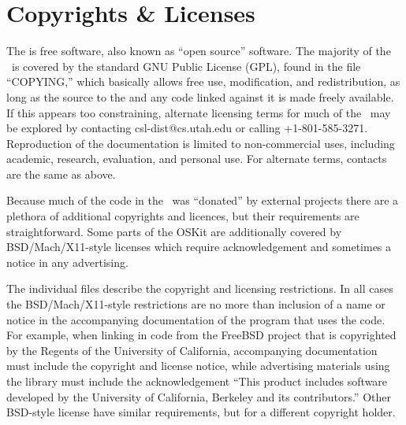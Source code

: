 %
% 
%
\label{licensing}

\section{Copyrights \& Licenses}

The \oskit{} is free software, also known as ``open source'' software.
The majority of the \oskit\ is covered by the standard GNU Public
License (GPL), found in the file ``COPYING,'' which basically allows
free use, modification, and redistribution, as long as the source to the
\oskit{} and any code linked against it is made freely available.
If this appears too constraining,
alternate licensing terms for much of the \oskit\ may be explored by
contacting csl-dist@cs.utah.edu or calling +1-801-585-3271.
Reproduction of the documentation is limited to non-commercial
uses, including academic, research, evaluation, and personal use.
For alternate terms, contacts are the same as above.

Because much of the code in the \oskit\ was ``donated'' by external
projects there are a plethora of additional copyrights and licences,
but their requirements are straightforward.
Some parts of the OSKit are additionally covered by BSD/Mach/X11-style
licenses which require acknowledgement and sometimes a notice in any
advertising.

The individual
files describe the copyright and licensing restrictions.  In all cases
the BSD/Mach/X11-style restrictions are no more than inclusion of a name
or notice in the
accompanying documentation of the program that uses the code.  For
example, when linking in code from the FreeBSD project that is
copyrighted by the Regents of the University of California,
accompanying documentation must include the copyright and license
notice, while advertising materials using the library must include the
acknowledgement ``This product includes software developed by the
University of California, Berkeley and its contributors.''  Other
BSD-style license have similar requirements, but for a different
copyright holder.

